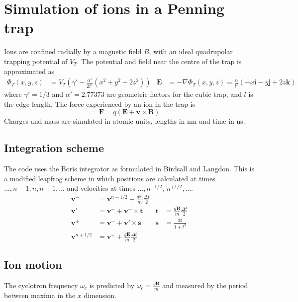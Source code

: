 \documentclass[10pt,conference,onecolumn]{IEEEtran}
\begin{document}
\section{Simulation of ions in a Penning trap}

Ions are confined radially by a magnetic field $B$, with an ideal quadrupolar trapping potential of $V_T$.
The potential and field near the centre of the trap is approximated as 
\begin{align}
\Phi_T(x,y,z) &= V_T (\gamma' - \frac{\alpha'}{2l^2}(x^2 + y^2 - 2z^2)) &
\mathbf{E} &= - \nabla \Phi_T(x,y,z) = \frac{\alpha}{l^2}(-x\mathbf{i} -y\mathbf{j} +2z\mathbf{k})
\end{align}
where $\gamma' = 1/3$ and $\alpha' = 2.77373$ are geometric factors for the cubic trap, and $l$ is the edge length\cite{Guan1995}.
The force experienced by an ion in the trap is
\begin{equation}
\mathbf{F} = q(\mathbf{E} + \mathbf{v} \times \mathbf{B})
\end{equation}
Charges and mass are simulated in atomic units, lengths in nm and time in ns.



\subsection{Integration scheme}
The code uses the Boris integrator\cite{Boris1970} as formulated in Birdsall and Langdon\cite{Birdsall1985}.
This is a modified leapfrog scheme in which positions are calculated at times $..., n-1, n, n+1, ...$ and velocities at times $..., n^{-1/2}$, $n^{+1/2}, ...$.
\begin{align}
\mathbf{v}^- &= \mathbf{v}^{n-1/2} + \frac{q \mathbf{E}}{m} \frac{\Delta t}{2} \\
\mathbf{v}'  &= \mathbf{v}^- + \mathbf{v}^- \times \mathbf{t} & \mathbf{t}   &= \frac{q\mathbf{B}}{m} \frac{\Delta t}{2} \\
\mathbf{v}^+ &= \mathbf{v}^- + \mathbf{v}' \times \mathbf{s} & \mathbf{s}   &= \frac{2\mathbf{t}}{1 + t^2} \\
\mathbf{v}^{n+1/2} &= \mathbf{v}^+ + \frac{q \mathbf{E}}{m} \frac{\Delta t}{2}
\end{align}


\subsection{Ion motion}

The cyclotron frequency $\omega_c$ is predicted by $\omega_c = \frac{q\mathbf{B}}{m}$\cite{Guan1995} and measured by the period between maxima in the $x$ dimension.
\end{document}
